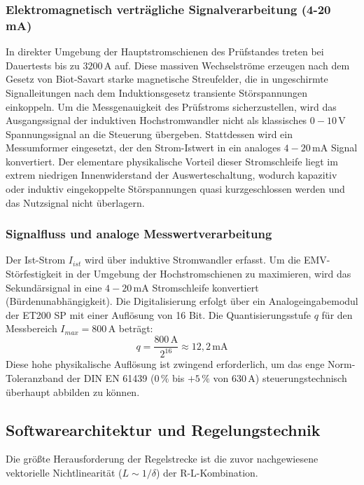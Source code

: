 \subsubsection{Elektromagnetisch verträgliche Signalverarbeitung (4-20 mA)}
In direkter Umgebung der Hauptstromschienen des Prüfstandes treten bei Dauertests bis zu $3200\,\text{A}$ auf. Diese massiven Wechselströme erzeugen nach dem Gesetz von Biot-Savart starke magnetische Streufelder, die in ungeschirmte Signalleitungen nach dem Induktionsgesetz transiente Störspannungen einkoppeln. 
Um die Messgenauigkeit des Prüfstroms sicherzustellen, wird das Ausgangssignal der induktiven Hochstromwandler nicht als klassisches $0-10\,\text{V}$ Spannungssignal an die Steuerung übergeben. Stattdessen wird ein Messumformer eingesetzt, der den Strom-Istwert in ein analoges $4-20\,\text{mA}$ Signal konvertiert. Der elementare physikalische Vorteil dieser Stromschleife liegt im extrem niedrigen Innenwiderstand der Auswerteschaltung, wodurch kapazitiv oder induktiv eingekoppelte Störspannungen quasi kurzgeschlossen werden und das Nutzsignal nicht überlagern.

\subsubsection{Signalfluss und analoge Messwertverarbeitung}
Der Ist-Strom $I_{ist}$ wird über induktive Stromwandler erfasst. Um die EMV-Störfestigkeit in der Umgebung der Hochstromschienen zu maximieren, wird das Sekundärsignal in eine $4-20\,\text{mA}$ Stromschleife konvertiert (Bürdenunabhängigkeit).
Die Digitalisierung erfolgt über ein Analogeingabemodul der ET200 SP mit einer Auflösung von 16 Bit. Die Quantisierungsstufe $q$ für den Messbereich $I_{max} = 800\,\text{A}$ beträgt:
\begin{equation}
    q = \frac{800\,\text{A}}{2^{16}} \approx 12,2\,\text{mA}
\end{equation}
Diese hohe physikalische Auflösung ist zwingend erforderlich, um das enge Norm-Toleranzband der DIN EN 61439 ($0\,\%$ bis $+5\,\%$ von 630\,A) steuerungstechnisch überhaupt abbilden zu können.


\subsection{Softwarearchitektur und Regelungstechnik}
\label{sec:software_regelung}

Die größte Herausforderung der Regelstrecke ist die zuvor nachgewiesene vektorielle Nichtlinearität ($L \sim 1/\delta$) der R-L-Kombination.

